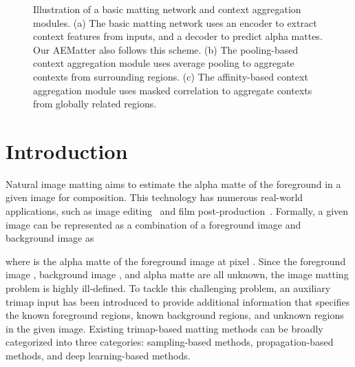 \documentclass[10pt,twocolumn,letterpaper]{article}
\begin{document}
\begin{figure}[!t]
    \begin{center}
\vspace{-1pt}
\vspace{-1pt}
\vspace{-1pt}
    \end{center}
    \caption{Illustration of a basic matting network and context aggregation modules. (a) The basic matting network uses an encoder to extract context features from inputs, and a decoder to predict alpha mattes. Our AEMatter also follows this scheme. (b) The pooling-based context aggregation module uses average pooling to aggregate contexts from  surrounding regions. (c) The affinity-based context aggregation module uses masked correlation to aggregate contexts from globally related regions.}
\label{fig:overs}
\end{figure}




\section{Introduction}
\label{sec:intro}
Natural image matting aims to estimate the alpha matte of the foreground in a given image for composition.
This technology has numerous real-world applications, such as image editing~\cite{2009Sketch2Photo,2017Robust} and film post-production~\cite{2015Integrated,Wang_2021_ICCV}. Formally, a given image  can be represented as a combination of a foreground image  and background image  as

where  is the alpha matte of the foreground image at pixel .
Since the foreground image , background image , and alpha matte  are all unknown, the image matting problem is highly ill-defined.
To tackle this challenging problem, an auxiliary trimap input has been introduced to provide additional information that specifies the known foreground regions, known background regions, and unknown regions in the given image. 
Existing trimap-based matting methods can be broadly categorized into three categories: sampling-based methods, propagation-based methods, and deep learning-based methods.
\end{document}
